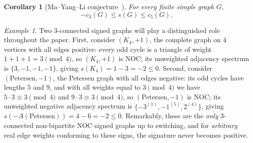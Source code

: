 \documentclass[10pt,letterpaper]{article}
\theoremstyle{zetaplain}
\newtheorem{corollary}[theorem]{Corollary}
\theoremstyle{zetadef}
\theoremstyle{remark}
\newtheorem*{example}{Example}
\numberwithin{equation}{section}
\begin{document}
\begin{corollary}[Ma--Yang--Li conjecture~\cite{MYL13}]\label{cor:MYL}
For every finite simple graph $G$,
\[
  -c_3(G) \le s(G) \le c_5(G).
\]
\end{corollary}

\begin{example}
Two $3$-connected signed graphs will play a distinguished role throughout the paper. First, consider $(K_4, +1)$, the complete graph on $4$ vertices with all edges positive: every odd cycle is a triangle of weight $1+1+1 = 3 \pmod 4$, so $(K_4, +1)$ is NOC; its unweighted adjacency spectrum is $\{3, -1, -1, -1\}$, giving $s(K_4) = 1 - 3 = -2 \le 0$. Second, consider $(\mathrm{Petersen}, -1)$, the Petersen graph with all edges negative: its odd cycles have lengths $5$ and $9$, and with all weights equal to $3 \pmod 4$ we have $5 \cdot 3 \equiv 3 \pmod 4$ and $9 \cdot 3 \equiv 3 \pmod 4$, so $(\mathrm{Petersen}, -1)$ is NOC; its unweighted negative adjacency spectrum is $\{-3^{(1)}, -1^{(5)}, 2^{(4)}\}$, giving $s(-A(\mathrm{Petersen})) = 4 - 6 = -2 \le 0$. Remarkably, these are the \emph{only} $3$-connected non-bipartite NOC signed graphs up to switching, and for \emph{arbitrary} real edge weights conforming to these signs, the signature never becomes positive.
\end{example}
\end{document}
